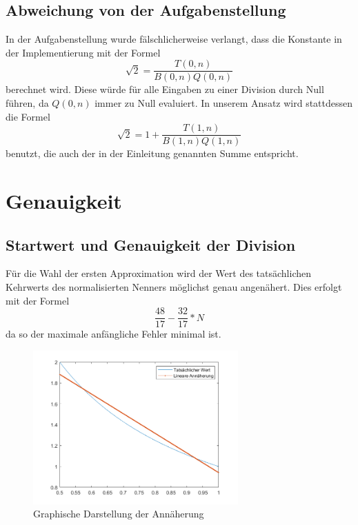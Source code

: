 \documentclass[course=erap]{aspdoc}
\begin{document}
	\subsection{Abweichung von der Aufgabenstellung}
	In der Aufgabenstellung wurde fälschlicherweise verlangt, dass die Konstante in der Implementierung mit der Formel 
	\begin{equation*}
		\sqrt{2} = \frac{T(0, n)}{B(0, n)Q(0, n)}
	\end{equation*}
	berechnet wird. Diese würde für alle Eingaben zu einer Division durch Null führen, da $Q(0, n)$ immer zu Null evaluiert. 
	In unserem Ansatz wird stattdessen die Formel
	\begin{equation*}
		\sqrt{2} = 1 + \frac{T(1, n)}{B(1, n)Q(1, n)}
	\end{equation*}
	benutzt, die auch der in der Einleitung genannten Summe entspricht.
	
	
	\newpage %
	\section{Genauigkeit}
	\subsection{Startwert und Genauigkeit der Division} 
	Für die Wahl der ersten Approximation wird der Wert des tatsächlichen Kehrwerts des normalisierten Nenners möglichst genau angenähert. Dies erfolgt mit der Formel
	\begin{equation*}
		\frac{48}{17} - \frac{32}{17} * N
	\end{equation*}
	da so der maximale anfängliche Fehler minimal ist.\cite{Pandey2021} \newline
	
	\begin{figure}[h]
		\centering
		\includegraphics[width=0.7\textwidth]{Abbildungen/lineareApproximation.png}
		\caption{Graphische Darstellung der Annäherung}
	\end{figure}
	
\end{document}

